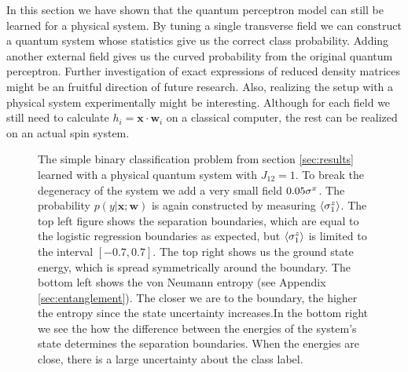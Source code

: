 \noindent In this section we have shown that the quantum perceptron model can still be learned for a physical system. By tuning a single transverse field we can construct a quantum system whose statistics give us the correct class probability. Adding another external field gives us the curved probability from the original quantum perceptron. Further investigation of exact expressions of reduced density matrices might be an fruitful direction of future research. Also, realizing the setup with a physical system experimentally might be interesting. Although for each field we still need to calculate $h_i = \mathbf{x}\cdot \mathbf{w}_i$ on a classical computer, the rest can be realized on an actual spin system. 
\clearpage
\begin{figure}[htb!]
    \centering
    \caption{The simple binary classification problem from section \ref{sec:results} learned with a physical quantum system with $J_{12}=1$. To break the degeneracy of the system we add a very small field $0.05\sigma^{x}$. The probability $p(y|\mathbf{x};\mathbf{w})$ is again constructed by measuring $\expval{\sigma^{z}_1}$. The top left figure shows the separation boundaries, which are equal to the logistic regression boundaries as expected, but $\expval{\sigma^{z}_1}$ is limited to the interval $[-0.7,0.7]$. The top right shows us the ground state energy, which is spread symmetrically around the boundary. The bottom left shows the von Neumann entropy (see Appendix \ref{sec:entanglement}). The closer we are to the boundary, the higher the entropy since the state uncertainty increases.In the bottom right we see the how the difference between the energies of the system's state determines the separation boundaries. When the energies are close, there is a large uncertainty about the class label.}
    \label{fig:hx_full}
\end{figure}
\clearpage

